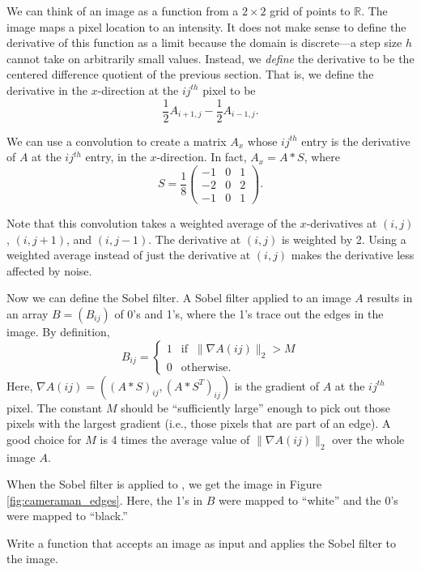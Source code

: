 We can think of an image as a function from a $2 \times 2$ grid of points to $\mathbb{R}$.
The image maps a pixel location to an intensity.
It does not make sense to define the derivative of this function as a limit because the domain is discrete---a step size $h$ cannot take on arbitrarily small values.
Instead, we \emph{define} the derivative to be the centered difference quotient of the previous section.
That is, we define the derivative in the $x$-direction at the $ij^{th}$ pixel to be 
\[
\frac{1}{2}A_{i+1, j} - \frac{1}{2}A_{i-1, j}.
\]

We can use a convolution to create a matrix $A_x$ whose $ij^{th}$ entry is the derivative of $A$ at the $ij^{th}$ entry, in the $x$-direction.
In fact, $A_x = A \ast S$, where
\[
S = \frac{1}{8} \begin{pmatrix}
-1 & 0 & 1\\
-2 & 0 & 2\\
-1 & 0 & 1
\end{pmatrix}.
\]

Note that this convolution takes a weighted average of the $x$-derivatives at $(i, j)$, $(i, j+1)$, and $(i, j-1)$. 
The derivative at $(i, j)$ is weighted by 2.
Using a weighted average instead of just the derivative at $(i, j)$ makes the derivative less affected by noise.

Now we can define the Sobel filter. 
A Sobel filter applied to an image $A$ results in an array $B = (B_{ij})$ of 0's and 1's, where the 1's trace out the edges in the image. 
By definition,
\[
B_{ij} = \left\{
     \begin{array}{ll}
       1 & \text{if}\; \;\|\nabla A(ij)\|_2 > M \\
       0 & \text{otherwise}.
     \end{array}
   \right.
\]
Here, $\nabla A(ij) = ((A \ast S)_{ij}, (A\ast S^T)_{ij})$ is the gradient of $A$ at the $ij^{th}$ pixel.
The constant $M$ should be ``sufficiently large'' enough to pick out those pixels with the largest gradient (i.e., those pixels that are part of an edge).
A good choice for $M$ is 4 times the average value of $\|\nabla A(ij)\|_2$ over the whole image $A$.


When the Sobel filter is applied to , we get the image in Figure \ref{fig:cameraman_edges}. 
Here, the 1's in $B$ were mapped to ``white'' and the 0's were mapped to ``black.''




\begin{problem}
Write a function that accepts an image as input and applies the Sobel filter to the image.
\end{problem}




